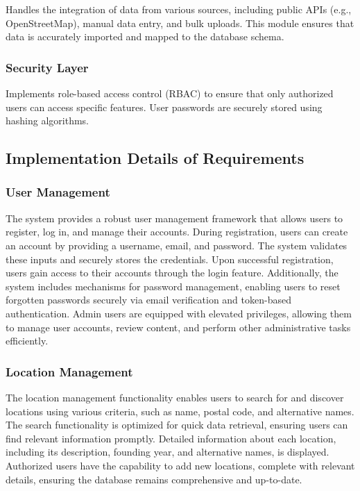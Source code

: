 Handles the integration of data from various sources, including public APIs (e.g., OpenStreetMap), manual data entry, and bulk uploads. This module ensures that data is accurately imported and mapped to the database schema.

\subsubsection{Security Layer}
Implements role-based access control (RBAC) to ensure that only authorized users can access specific features. User passwords are securely stored using hashing algorithms.

\subsection{Implementation Details of Requirements}

\subsubsection{User Management}
The system provides a robust user management framework that allows users to register, log in, and manage their accounts. During registration, users can create an account by providing a username, email, and password. The system validates these inputs and securely stores the credentials. Upon successful registration, users gain access to their accounts through the login feature. Additionally, the system includes mechanisms for password management, enabling users to reset forgotten passwords securely via email verification and token-based authentication. Admin users are equipped with elevated privileges, allowing them to manage user accounts, review content, and perform other administrative tasks efficiently.

\subsubsection{Location Management}
The location management functionality enables users to search for and discover locations using various criteria, such as name, postal code, and alternative names. The search functionality is optimized for quick data retrieval, ensuring users can find relevant information promptly. Detailed information about each location, including its description, founding year, and alternative names, is displayed. Authorized users have the capability to add new locations, complete with relevant details, ensuring the database remains comprehensive and up-to-date.

